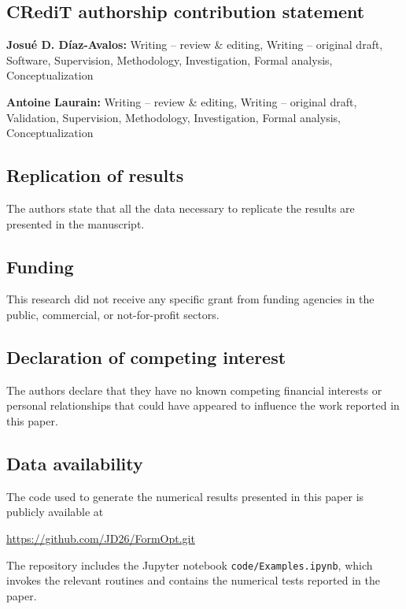 \documentclass[preprint,9pt]{elsarticle}
\begin{document}
\subsection*{\textbf{CRediT authorship contribution statement}}

\textbf{Josu\'e D. D\'iaz-Avalos:}
Writing -- review \& editing, Writing -- original draft,
Software, Supervision, Methodology, Investigation,
Formal analysis, Conceptualization

\textbf{Antoine Laurain:}
Writing -- review \& editing, Writing -- original draft,
Validation, Supervision, Methodology, Investigation,
Formal analysis, Conceptualization

\subsection*{\textbf{Replication of results}}

The authors state that all the data necessary to replicate
the results are presented in the manuscript.

\subsection*{\textbf{Funding}}

This research did not receive any specific grant from funding
agencies in the public, commercial, or not-for-profit sectors.

\subsection*{\textbf{Declaration of competing interest}}

The authors declare that they have no known competing
financial interests or personal relationships that could have appeared
to influence the work reported in this paper.

\subsection*{\textbf{Data availability}}

The code used to generate
the numerical results presented in this paper is publicly available at
\begin{center}
\url{https://github.com/JD26/FormOpt.git}
\end{center}
The repository includes the Jupyter notebook \texttt{code/Examples.ipynb},
which invokes the relevant routines and contains the numerical tests
reported in the paper.


 

\end{document}
